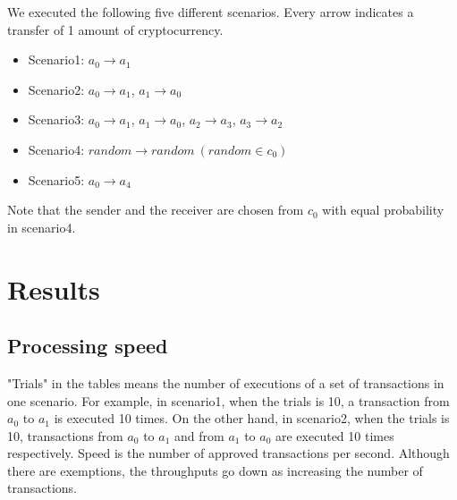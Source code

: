 \documentclass[a4paper, oneside]{discothesis}
\begin{document}
We executed the following five different scenarios.
Every arrow indicates a transfer of 1 amount of cryptocurrency.
\begin{itemize}
    \item Scenario1: $a_0 \rightarrow a_1$
    \item Scenario2: $a_0 \rightarrow a_1$, $a_1 \rightarrow a_0$
    \item Scenario3: $a_0 \rightarrow a_1$, $a_1 \rightarrow a_0$, $a_2 \rightarrow a_3$, $a_3 \rightarrow a_2$
    \item Scenario4: $random \rightarrow random~(random \in c_0)$
    \item Scenario5: $a_0 \rightarrow a_4$
\end{itemize}
Note that the sender and the receiver are chosen from $c_0$ with equal probability in scenario4.

\section{Results}

\subsection{Processing speed}
"Trials" in the tables means the number of executions of a set of transactions in one scenario.
For example, in scenario1, when the trials is 10, a transaction from $a_0$ to $a_1$
is executed 10 times.
On the other hand, in scenario2, when the trials is 10,
transactions from $a_0$ to $a_1$ and from $a_1$ to $a_0$ are executed 10 times respectively.
Speed is the number of approved transactions per second.
Although there are exemptions, the throughputs go down as increasing the number of transactions.
\end{document}
